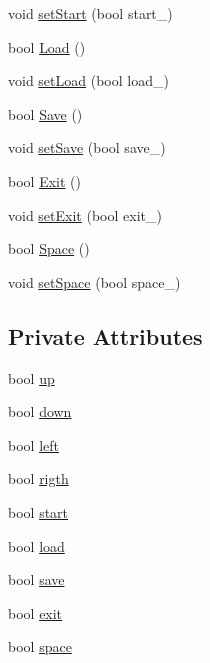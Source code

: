 \begin{DoxyCompactItemize}
\item 
void \hyperlink{classteclado_ae3201fd03a047897b99fde66546792ac}{set\+Start} (bool start\+\_\+)
\item 
bool \hyperlink{classteclado_ace06f3cb6f9f4be497efb14c0ec1aaad}{Load} ()
\item 
void \hyperlink{classteclado_a4c831e1ccee5e616f3f96fe9af6f3e7e}{set\+Load} (bool load\+\_\+)
\item 
bool \hyperlink{classteclado_a5e9764397ac17fd1b360057f112b3df4}{Save} ()
\item 
void \hyperlink{classteclado_a0b25a2937fab3668960674bf616668b2}{set\+Save} (bool save\+\_\+)
\item 
bool \hyperlink{classteclado_a64c38c5f519a42d11c778d8d5842f039}{Exit} ()
\item 
void \hyperlink{classteclado_a4a089b6d0db664921a55f97091dcda91}{set\+Exit} (bool exit\+\_\+)
\item 
bool \hyperlink{classteclado_ae954ce01daa73a1983671f3ceb92ddca}{Space} ()
\item 
void \hyperlink{classteclado_a08c3d1161b82aedfabf3c77f6f3cc86a}{set\+Space} (bool space\+\_\+)
\end{DoxyCompactItemize}
\subsection*{Private Attributes}
\begin{DoxyCompactItemize}
\item 
bool \hyperlink{classteclado_a74a37a3c06db1e530c2da93c16c2d820}{up}
\item 
bool \hyperlink{classteclado_a1fd914ff92bee012b6aabe48bd7725f4}{down}
\item 
bool \hyperlink{classteclado_a5322f750a38a41e0c252b450592cb606}{left}
\item 
bool \hyperlink{classteclado_a7bffbb3212dd8ddc7a4acff8a5e830e9}{rigth}
\item 
bool \hyperlink{classteclado_a6c14e3a2dbae6bda094ae925e341edf0}{start}
\item 
bool \hyperlink{classteclado_acfdc58aa2a9455f551659c6cd59f92fd}{load}
\item 
bool \hyperlink{classteclado_a4f469df852c3dd6ff88e0ec6babe1965}{save}
\item 
bool \hyperlink{classteclado_a51f4be6dc4ff0b012c41bb2b0380a9d5}{exit}
\item 
bool \hyperlink{classteclado_a4b4ccb376875a14e2b3962a407994c8b}{space}
\end{DoxyCompactItemize}


